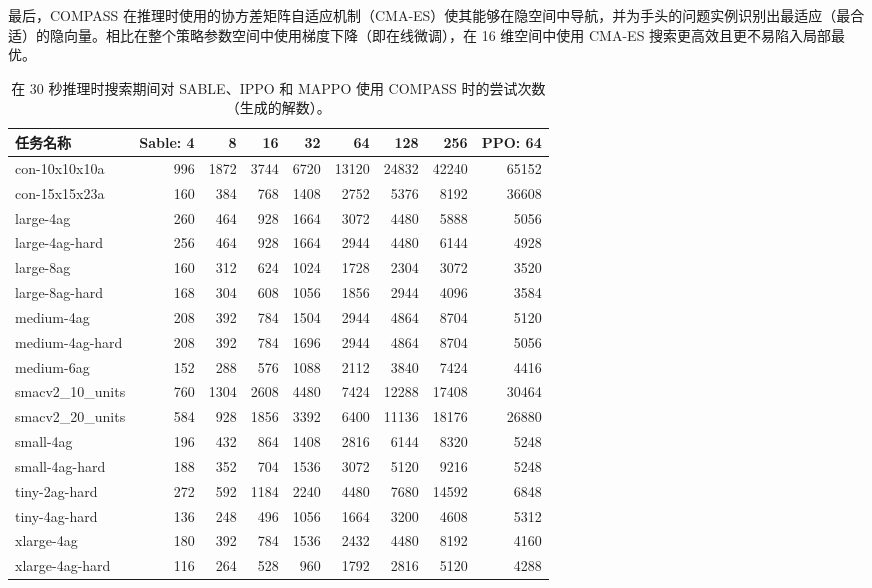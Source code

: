 \documentclass[11pt,UTF8,fontset=fandol]{ctexart}
\begin{document}
最后，COMPASS 在推理时使用的协方差矩阵自适应机制（CMA-ES）使其能够在隐空间中导航，并为手头的问题实例识别出最适应（最合适）的隐向量。相比在整个策略参数空间中使用梯度下降（即在线微调），在 16 维空间中使用 CMA-ES 搜索更高效且更不易陷入局部最优。

\begin{table}[H]\centering
\caption{在 30 秒推理时搜索期间对 SABLE、IPPO 和 MAPPO 使用 COMPASS 时的尝试次数（生成的解数）。}
\label{tab:14}
\small
\begin{tabular}{lrrrrrrrr}
\toprule
任务名称 & Sable: 4 & 8 & 16 & 32 & 64 & 128 & 256 & PPO: 64\\
\midrule
con-10x10x10a & 996 & 1872 & 3744 & 6720 & 13120 & 24832 & 42240 & 65152\\
con-15x15x23a & 160 & 384 & 768 & 1408 & 2752 & 5376 & 8192 & 36608\\
large-4ag & 260 & 464 & 928 & 1664 & 3072 & 4480 & 5888 & 5056\\
large-4ag-hard & 256 & 464 & 928 & 1664 & 2944 & 4480 & 6144 & 4928\\
large-8ag & 160 & 312 & 624 & 1024 & 1728 & 2304 & 3072 & 3520\\
large-8ag-hard & 168 & 304 & 608 & 1056 & 1856 & 2944 & 4096 & 3584\\
medium-4ag & 208 & 392 & 784 & 1504 & 2944 & 4864 & 8704 & 5120\\
medium-4ag-hard & 208 & 392 & 784 & 1696 & 2944 & 4864 & 8704 & 5056\\
medium-6ag & 152 & 288 & 576 & 1088 & 2112 & 3840 & 7424 & 4416\\
smacv2\_10\_units & 760 & 1304 & 2608 & 4480 & 7424 & 12288 & 17408 & 30464\\
smacv2\_20\_units & 584 & 928 & 1856 & 3392 & 6400 & 11136 & 18176 & 26880\\
small-4ag & 196 & 432 & 864 & 1408 & 2816 & 6144 & 8320 & 5248\\
small-4ag-hard & 188 & 352 & 704 & 1536 & 3072 & 5120 & 9216 & 5248\\
tiny-2ag-hard & 272 & 592 & 1184 & 2240 & 4480 & 7680 & 14592 & 6848\\
tiny-4ag-hard & 136 & 248 & 496 & 1056 & 1664 & 3200 & 4608 & 5312\\
xlarge-4ag & 180 & 392 & 784 & 1536 & 2432 & 4480 & 8192 & 4160\\
xlarge-4ag-hard & 116 & 264 & 528 & 960 & 1792 & 2816 & 5120 & 4288\\
\bottomrule
\end{tabular}
\end{table}
\end{document}
